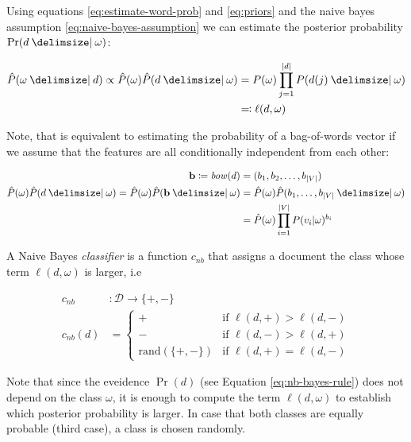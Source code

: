Using equations \ref{eq:estimate-word-prob} and \ref{eq:priors} and the naive
bayes assumption \ref{eq:naive-bayes-assumption} we can estimate the posterior
probability $\Pr(d \given \omega)$:

\begin{equation}
\begin{split}
\hat{P}(\omega \given d) \propto \hat{P}(\omega)\hat{P}(d\given \omega)
&= P(\omega)\prod\limits_{j=1}^{|d|} P(d(j) \given \omega) \\ &\eqqcolon
\ell(d,\omega)
\end{split}
\end{equation}

Note, that is equivalent to estimating the probability of a bag-of-words vector
if we assume that the features are all conditionally independent from each other:

\begin{equation}
\begin{split}
\textbf{b} \coloneqq \mli{bow}(d) &= (b_1, b_2, \ldots, b_{|V|}) \\ 
\hat{P}(\omega)\hat{P}(d\given \omega) = \hat{P}(\omega)\hat{P}(\mathbf{b}
\given \omega) &= \hat{P}(\omega)\hat{P}(b_1,\ldots,b_{|V|} \given
\omega)\\
&= \hat{P}(\omega)\prod\limits_{i=1}^{|V|}P(v_i|\omega)^{ b_i }
\end{split}
\end{equation}

A Naive Bayes \emph{classifier} is a function $c_{nb}$ that assigns a document the
class whose term $\ell(d, \omega)$ is larger, i.e

\begin{equation}
\begin{split}
c_{nb}&: \mathcal{D} \to \{+,-\} \\
c_{nb}(d) &= \begin{cases} + & \text{if~} \ell(d,+) > \ell(d,-) \\ - &
\text{if~} \ell(d,-) > \ell(d,+) \\ \text{rand}(\{+,-\}) &
\text{if~} \ell(d,+) = \ell(d,-)\end{cases}
\end{split}
\end{equation}

Note that since the eveidence $\Pr(d)$ (see Equation
\ref{eq:nb-bayes-rule}) does not depend on the class $\omega$, it is enough to
compute the term $\ell(d,\omega)$ to establish which posterior probability is
larger. In case that both classes are equally probable (third case), a class is
chosen randomly. 

